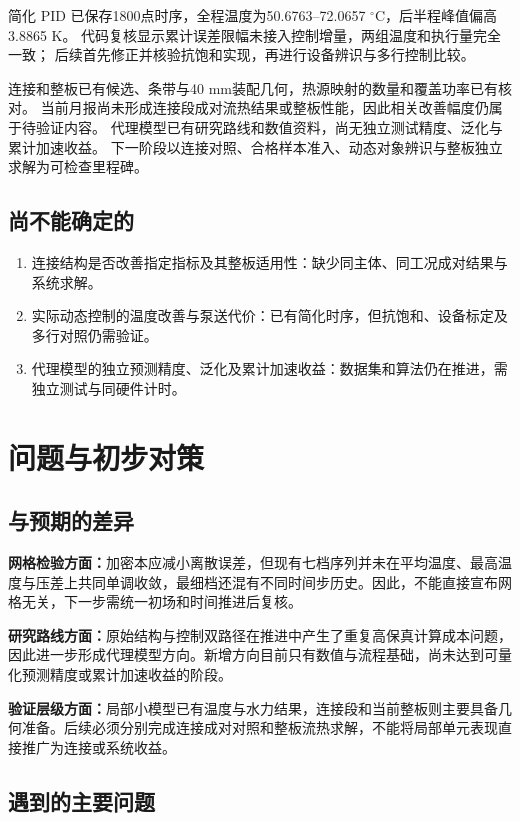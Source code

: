 \documentclass[stage2,UTF8,fontset=fandol]{ydzjreport}
\begin{document}
简化 PID 已保存1800点时序，全程温度为50.6763--72.0657 $^\circ$C，后半程峰值偏高3.8865 K。
代码复核显示累计误差限幅未接入控制增量，两组温度和执行量完全一致；
后续首先修正并核验抗饱和实现，再进行设备辨识与多行控制比较。

连接和整板已有候选、条带与40 mm装配几何，热源映射的数量和覆盖功率已有核对。
当前月报尚未形成连接段成对流热结果或整板性能，因此相关改善幅度仍属于待验证内容。
代理模型已有研究路线和数值资料，尚无独立测试精度、泛化与累计加速收益。
下一阶段以连接对照、合格样本准入、动态对象辨识与整板独立求解为可检查里程碑。
\subsection{尚不能确定的}
\begin{enumerate}
\item 连接结构是否改善指定指标及其整板适用性：缺少同主体、同工况成对结果与系统求解。
\item 实际动态控制的温度改善与泵送代价：已有简化时序，但抗饱和、设备标定及多行对照仍需验证。
\item 代理模型的独立预测精度、泛化及累计加速收益：数据集和算法仍在推进，需独立测试与同硬件计时。
\end{enumerate}

\section{问题与初步对策}

\subsection{与预期的差异}

\textbf{网格检验方面：}加密本应减小离散误差，但现有七档序列并未在平均温度、最高温度与压差上共同单调收敛，最细档还混有不同时间步历史。因此，不能直接宣布网格无关，下一步需统一初场和时间推进后复核。

\textbf{研究路线方面：}原始结构与控制双路径在推进中产生了重复高保真计算成本问题，因此进一步形成代理模型方向。新增方向目前只有数值与流程基础，尚未达到可量化预测精度或累计加速收益的阶段。

\textbf{验证层级方面：}局部小模型已有温度与水力结果，连接段和当前整板则主要具备几何准备。后续必须分别完成连接成对对照和整板流热求解，不能将局部单元表现直接推广为连接或系统收益。


\subsection{遇到的主要问题}
\end{document}
